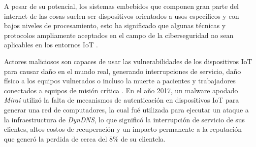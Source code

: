 A pesar de su potencial, los sistemas embebidos que componen gran
parte del internet de las cosas suelen ser dispositivos orientados a usos
específicos y con bajos niveles de procesamiento, esto ha significado que
algunas técnicas y protocolos ampliamente aceptados en el campo de la
ciberseguridad no sean aplicables en los entornos IoT \cite{krishnasrijaLightweightMutualTransitive2023}.

Actores maliciosos son capaces de usar las vulnerabilidades de los dispositivos IoT para causar daño en el mundo real, generando
interrupciones de servicio, daño físico a los equipos vulnerados o incluso la muerte a pacientes y trabajadores conectados a equipos de misión crítica \cite{alsubaeiIoMTSAFInternetMedical2019,greenbergCrashOverrideMalware2017}. En el año 2017, un malware apodado \textit{Mirai} utilizó la falta de mecanismos de autenticación en dispositivos IoT para generar una red de computadores, la cual fué utilizada para ejecutar un ataque a la infraestructura de \textit{DynDNS}, lo que significó la interrupción de servicio de sus clientes, altos costos de recuperación y un impacto permanente a la reputación que generó la perdida de cerca del 8\% de su clientela. 